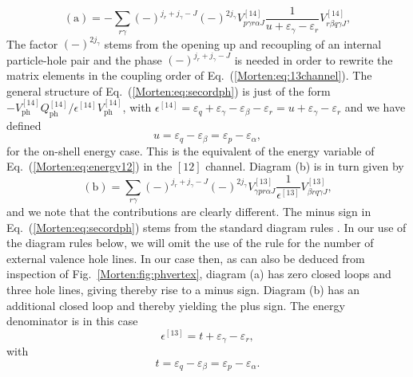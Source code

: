 \begin{equation}
      \mathrm{(a)}=-\sum_{r\gamma}(-)^{j_r+j_{\gamma}-J}(-)^{2j_{\gamma}}
      V^{[14]}_{p\gamma r\alpha J}
      \frac{1}{u+\varepsilon_{\gamma}-
                \varepsilon_{r}} V^{[14]}_{r\beta q\gamma J},
       \label{Morten:eq:secordph}
\end{equation}
The factor $(-)^{2j_{\gamma}}$ stems from the opening up
and recoupling of an internal particle-hole pair \cite{Morten:kstop81}
and the phase $(-)^{j_r+j_{\gamma}-J}$ is needed in order
to rewrite the matrix elements in the coupling order of
Eq.~(\ref{Morten:eq:13channel}).
The general structure of Eq.~(\ref{Morten:eq:secordph}) is
just of the form $-V_{\mathrm{ph}}^{[14]}Q^{[14]}_{\mathrm{ph}}/\epsilon^{[14]}V_{\mathrm{ph}}^{[14]}$, with
$ \epsilon^{[14]}=\varepsilon_{q}+\varepsilon_{\gamma}-\varepsilon_{\beta}-
                \varepsilon_{r}=u+\varepsilon_{\gamma}-\varepsilon_{r}$
and we have defined
\begin{equation}
  u=\varepsilon_{q}-\varepsilon_{\beta}=\varepsilon_{p}-\varepsilon_{\alpha},
\end{equation}
for the on-shell energy case.
This is the equivalent of the energy variable of Eq.~(\ref{Morten:eq:energy12}) in
the $[12]$ channel.
Diagram (b) is in turn given by
\begin{equation}
      \mathrm{(b)}=\sum_{r\gamma}(-)^{j_r+j_{\gamma}-J}(-)^{2j_{\gamma}}
      V^{[13]}_{\gamma pr\alpha J}
      \frac{1}{\epsilon^{[13]}}V^{[13]}_{\beta rq\gamma J} ,
       \label{Morten:eq:secordphdirect}
\end{equation}
and we note that the contributions are clearly different.
The minus sign in Eq.~(\ref{Morten:eq:secordph}) stems from the standard
diagram rules \cite{Morten:kstop81}. 
In our use of the diagram rules below, we will omit the use
of the rule for the number of external valence hole lines.
In our case then, as can also be deduced from inspection of
Fig.~\ref{Morten:fig:phvertex}, diagram (a) has  zero closed loops and
three hole lines,
giving thereby rise to a minus sign. 
Diagram (b) has an additional closed
loop and thereby yielding the plus sign.
The energy denominator is in this case
\begin{equation} 
      \epsilon^{[13]}=t+\varepsilon_{\gamma}-\varepsilon_{r},
\end{equation}
with 
\begin{equation}
  t=\varepsilon_{q}-\varepsilon_{\beta}=\varepsilon_{p}-\varepsilon_{\alpha}.
\end{equation}
